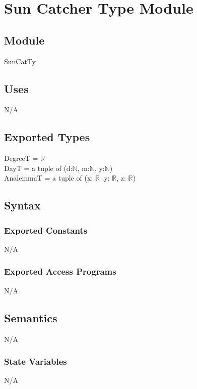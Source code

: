 \documentclass[12pt, titlepage]{article}
\begin{document}

\section{Sun Catcher Type Module} \label{ModuleSCTM} 

\subsection{Module}
SunCatTy

\subsection{Uses}

N/A\\

\subsection{Exported Types}

DegreeT = $\mathbb{R}$\\
DayT = a tuple of (d:$\mathbb{N}$, m:$\mathbb{N}$, y:$\mathbb{N}$)\\
AnalemmaT = a tuple of (x: $\mathbb{R}$ ,y: $\mathbb{R}$, z: $\mathbb{R}$)\\

\subsection{Syntax}

\subsubsection{Exported Constants}
N/A\\

\subsubsection{Exported Access Programs}
N/A\\

\subsection{Semantics}
N/A\\
\subsubsection{State Variables}
N/A\\
\end{document}
